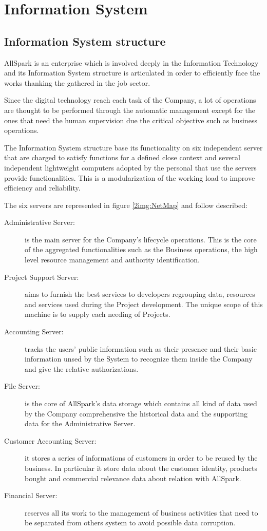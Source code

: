 \chapter{Information System}
 
\section{Information System structure}
AllSpark is an enterprise which is involved deeply in the Information Technology and its Information System structure is articulated in order to efficiently face the works thanking the gathered in the job sector.

Since the digital technology reach each task of the Company, a lot of operations are thought to be performed through the automatic management except for the ones that need the human supervision due the critical objective such as business operations. 

The Information System structure base its functionality on six independent server that are charged to satisfy functions for a defined close context and several independent lightweight computers adopted by the personal that use the servers provide functionalities. This is a modularization of the working load to improve efficiency and reliability.

The six servers are represented in figure \ref{2img:NetMap} and follow described:
\begin{description}
\item[Administrative Server:] is the main server for the Company's lifecycle operations. This is the core of the aggregated functionalities such as the Business operations, the high level resource management and authority identification.
\item[Project Support Server:] aims to furnish the best services to developers regrouping data, resources and services used during the Project development. The unique scope of this machine is to supply each needing of Projects.
\item[Accounting Server:] tracks the users' public information such as their presence and their basic information unsed by the System to recognize them inside the Company and give the relative authorizations.
\item[File Server:] is the core of AllSpark's data storage which contains all kind of data used by the Company comprehensive the historical data and the supporting data for the Administrative Server. 
\item[Customer Accounting Server:] it stores a series of informations of customers in order to be reused by the business. In particular it store data about the customer identity, products bought and commercial relevance data about relation with AllSpark.
\item[Financial Server:] reserves all its work to the management of business activities that need to be separated from others system to avoid possible data corruption.
\end{description}

